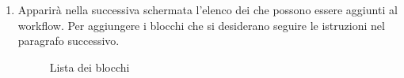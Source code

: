 \begin{enumerate}
\newpage
\item Apparirà nella successiva schermata l'elenco dei  che possono essere aggiunti al workflow.
Per aggiungere i blocchi che si desiderano seguire le istruzioni nel paragrafo successivo.
\begin{figure}[!ht]
	\centering
	\caption{Lista dei blocchi}
\end{figure}

\end{enumerate}

